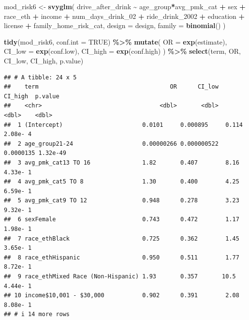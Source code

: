 \documentclass[
]{article}
\newenvironment{Shaded}{\begin{snugshade}}{\end{snugshade}}
\newcommand{\AttributeTok}[1]{\textcolor[rgb]{0.13,0.29,0.53}{#1}}
\newcommand{\ConstantTok}[1]{\textcolor[rgb]{0.56,0.35,0.01}{#1}}
\newcommand{\FunctionTok}[1]{\textcolor[rgb]{0.13,0.29,0.53}{\textbf{#1}}}
\newcommand{\NormalTok}[1]{#1}
\newcommand{\OtherTok}[1]{\textcolor[rgb]{0.56,0.35,0.01}{#1}}
\newcommand{\SpecialCharTok}[1]{\textcolor[rgb]{0.81,0.36,0.00}{\textbf{#1}}}
\begin{document}
\begin{Shaded}
\begin{Highlighting}[]
\NormalTok{mod\_risk6 }\OtherTok{\textless{}{-}} \FunctionTok{svyglm}\NormalTok{(}
\NormalTok{  drive\_after\_drink }\SpecialCharTok{\textasciitilde{}}\NormalTok{ age\_group}\SpecialCharTok{*}\NormalTok{avg\_pmk\_cat }\SpecialCharTok{+}\NormalTok{ sex }\SpecialCharTok{+}\NormalTok{ race\_eth }\SpecialCharTok{+}\NormalTok{ income }\SpecialCharTok{+} 
\NormalTok{     num\_days\_drink\_02 }\SpecialCharTok{+}\NormalTok{ ride\_drink\_2002 }\SpecialCharTok{+}\NormalTok{ education }\SpecialCharTok{+}\NormalTok{ license }\SpecialCharTok{+}
\NormalTok{    family\_home\_risk\_cat,}
  \AttributeTok{design =}\NormalTok{ design,}
  \AttributeTok{family =} \FunctionTok{binomial}\NormalTok{()}
\NormalTok{) }

\FunctionTok{tidy}\NormalTok{(mod\_risk6, }\AttributeTok{conf.int =} \ConstantTok{TRUE}\NormalTok{) }\SpecialCharTok{\%\textgreater{}\%}
  \FunctionTok{mutate}\NormalTok{(}
    \AttributeTok{OR =} \FunctionTok{exp}\NormalTok{(estimate),}
    \AttributeTok{CI\_low =} \FunctionTok{exp}\NormalTok{(conf.low),}
    \AttributeTok{CI\_high =} \FunctionTok{exp}\NormalTok{(conf.high)}
\NormalTok{  ) }\SpecialCharTok{\%\textgreater{}\%}
  \FunctionTok{select}\NormalTok{(term, OR, CI\_low, CI\_high, p.value) }
\end{Highlighting}
\end{Shaded}

\begin{verbatim}
## # A tibble: 24 x 5
##    term                                      OR      CI_low    CI_high  p.value
##    <chr>                                  <dbl>       <dbl>      <dbl>    <dbl>
##  1 (Intercept)                       0.0101     0.000895     0.114     2.08e- 4
##  2 age_group21-24                    0.00000266 0.000000522  0.0000135 1.32e-49
##  3 avg_pmk_cat13 TO 16               1.82       0.407        8.16      4.33e- 1
##  4 avg_pmk_cat5 TO 8                 1.30       0.400        4.25      6.59e- 1
##  5 avg_pmk_cat9 TO 12                0.948      0.278        3.23      9.32e- 1
##  6 sexFemale                         0.743      0.472        1.17      1.98e- 1
##  7 race_ethBlack                     0.725      0.362        1.45      3.65e- 1
##  8 race_ethHispanic                  0.950      0.511        1.77      8.72e- 1
##  9 race_ethMixed Race (Non-Hispanic) 1.93       0.357       10.5       4.44e- 1
## 10 income$10,001 - $30,000           0.902      0.391        2.08      8.08e- 1
## # i 14 more rows
\end{verbatim}
\end{document}
